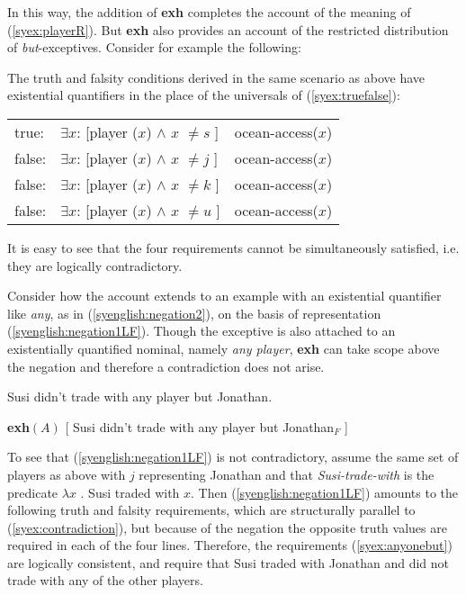 \documentclass[output=paper]{langscibook}
\begin{document}
In this way, the addition of \textbf{exh} completes the account of the meaning of (\ref{syex:playerR}).  
But \textbf{exh} also provides an account of the restricted distribution of \emph{but}-exceptives. Consider for example the following:

\z

The truth and falsity conditions derived in the same scenario as above have existential quantifiers in the place of the universals of (\ref{syex:truefalse}):



\ea \label{syex:contradiction}
    \begin{tabular}[t]{@{}l@{~}l@{~$\land$~}l@{}}
    true:  &  $\exists x$: [player ($x$) $\land$ $x$ $\neq s$ ] & ocean-access($x$)\\
    false: &  $\exists x$: [player ($x$) $\land$ $x$ $\neq j$ ] & ocean-access($x$)\\
    false: &  $\exists x$: [player ($x$) $\land$ $x$ $\neq k$ ] & ocean-access($x$)\\
    false: &  $\exists x$: [player ($x$) $\land$ $x$ $\neq u$ ] & ocean-access($x$)\\
    \end{tabular}
\z

It is easy to see that the four requirements cannot be simultaneously satisfied, i.e. they are logically contradictory.

Consider how the account extends to an example with an existential quantifier like \emph{any}, as in (\ref{syenglish:negation2}),  on the basis of representation (\ref{syenglish:negation1LF}).
Though the exceptive is also attached to an existentially quantified nominal, namely \emph{any player}, \textbf{exh} can take scope above the negation and therefore a contradiction does not arise.

\ea \label{syenglish:negation2} 
Susi didn't trade with any player but Jonathan.

\ex \label{syenglish:negation1LF}
\textbf{exh}$(A)$ [ Susi didn't trade with any player but Jonathan$_F$ ]\z


To see that (\ref{syenglish:negation1LF}) is not contradictory, assume the same set of players as above with $j$ representing Jonathan and that \textit{Susi-trade-with} is the predicate $\lambda x$ . Susi traded with $x$.  Then (\ref{syenglish:negation1LF}) amounts to the following truth and falsity requirements, which are structurally parallel to (\ref{syex:contradiction}), but because of the negation the opposite truth values are required in each of the four lines.  Therefore, the requirements (\ref{syex:anyonebut}) are logically consistent, and require that Susi traded with Jonathan and did not trade with any of the other players.
\end{document}
